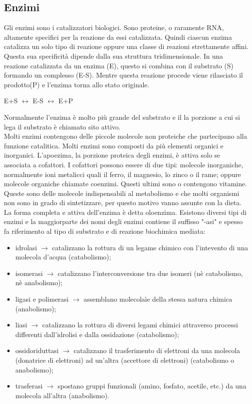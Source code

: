 \subsection{Enzimi}
Gli enzimi sono i catalizzatori biologici. Sono proteine, o raramente RNA, altamente specifici per la reazione da essi catalizzata. Quindi ciascun enzima catalizza un solo tipo di reazione oppure una classe di reazioni strettamente affini. Questa sua specificit\`a dipende dalla sua struttura tridimensionale. In una reazione catalizzata da un enzima (E), questo si combina con il substrato (S) formando un complesso (E-S). Mentre questa reazione procede viene rilasciato il prodotto(P) e l'enzima torna allo stato originale.
\\
\begin{center}E+S $\leftrightarrow$ E-S $\leftrightarrow$ E+P\end{center}
Normalmente l'enzima \`e molto pi\`u grande del substrato e il la porzione a cui si lega il substrato \`e chiamato sito attivo.
\\Molti enzimi contengono delle piccole molecole non proteiche che partecipano alla funzione catalitica. Molti enzimi sono composti da pi\`u elementi organici e inorganici. L'apoezima, la porzione proteica degli enzimi, \`e attiva solo se associata a cofattori. I cofattori possono essere di due tipi: molecole inorganiche, normalmente ioni metalicci quali il ferro, il magnesio, lo zinco o il rame; oppure molecole organiche chiamate coenzimi. Questi ultimi sono o contengono vitamine. Queste sono delle molecole indispensabili al metabolismo e che molti organismi non sono in grado di sintetizzare, per questo motivo vanno assunte con la dieta. La forma completa e attiva dell'enzima \`e detta oloenzima.
Esistono diversi tipi di enzimi e la maggiorparte dei nomi degli enzimi contiene il suffisso "-asi" e spesso fa riferimento al tipo di substrato e di reazione biochimica mediata:
\begin{itemize}
    \item idrolasi $\xrightarrow{}$ catalizzano la rottura di un legame chimico con l'intevento di una molecola d'acqua (catabolismo);
    \item isomerasi $\xrightarrow{}$ catalizzano l'interconversione tra due isomeri (n\`e catabolismo, n\`e anabolismo);
    \item ligasi e polimerasi $\xrightarrow{}$ assemblano molecolaìe della stessa natura chimica (anabolismo);
    \item liasi $\xrightarrow{}$ catalizzano la rottura di diversi legami chimici attraverso processi differenti dall'idrolisi e dalla ossidazione (catabolismo);
    \item ossidoriduttasi $\xrightarrow{}$ catalizzano il trasferimento di elettroni da una molecola (donatrice di elettroni) ad un'altra (accettore di elettroni) (catabolismo o anabolismo);
    \item trasferasi $\xrightarrow{}$ spostano gruppi funzionali (amino, fosfato, acetile, etc.) da una molecola all'altra (anabolismo).
\end{itemize}
